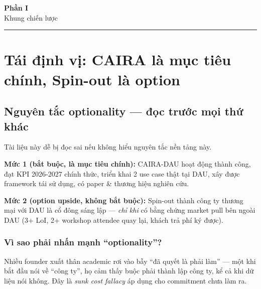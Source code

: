 \documentclass[11pt,a4paper]{article}
\begin{document}
\clearpage

\begin{center}
\vspace*{0.5em}
{\sffamily\bfseries\Huge\color{caira} Phần I}\\[0.5em]
{\sffamily\LARGE\color{mid} Khung chiến lược}\\[0.5em]
{\color{caira}\rule{6cm}{0.4pt}}
\end{center}
\vspace{1em}

\section{Tái định vị: CAIRA là mục tiêu chính, Spin-out là option}

\subsection{Nguyên tắc optionality --- đọc trước mọi thứ khác}

Tài liệu này dễ bị đọc sai nếu không hiểu nguyên tắc nền tảng này.

\begin{keybox}[title=Hai mức thành công]
\textbf{Mức 1 (bắt buộc, là mục tiêu chính):} CAIRA-DAU hoạt động thành công, đạt
KPI 2026-2027 chính thức, triển khai 2 use case thật tại DAU, xây được framework
tái sử dụng, có paper \& thương hiệu nghiên cứu.

\textbf{Mức 2 (option upside, không bắt buộc):} Spin-out thành công ty thương mại
với DAU là cổ đông sáng lập --- \textit{chỉ khi} có bằng chứng market pull bên
ngoài DAU (3+ LoI, 2+ workshop attendee quay lại, khách trả phí ký được).
\end{keybox}

\subsubsection*{Vì sao phải nhấn mạnh ``optionality''?}

Nhiều founder xuất thân academic rơi vào bẫy ``đã quyết là phải làm'' --- một
khi bắt đầu nói về ``công ty'', họ cảm thấy buộc phải thành lập công ty, kể cả
khi dữ liệu nói không. Đây là \textit{sunk cost fallacy} áp dụng cho commitment
chưa làm ra.
\end{document}

